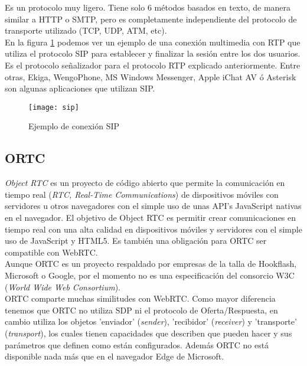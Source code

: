 Es un protocolo muy ligero. Tiene solo 6 métodos basados en texto, de manera similar a HTTP o SMTP, pero es completamente independiente del protocolo de transporte utilizado (TCP, UDP, ATM, etc). \\

En la figura \ref{fig:sip} podemos ver un ejemplo de una conexión multimedia con RTP que utiliza el protocolo SIP para establecer y finalizar la sesión entre los dos usuarios.\\

Es el protocolo señalizador para el protocolo RTP explicado anteriormente. Entre otras, Ekiga, WengoPhone, MS Windows Messenger, Apple iChat AV ó Asterisk son algunas aplicaciones que utilizan SIP.\\


\begin{figure}[h!]
\centering
\texttt{[image: sip]}
\caption{Ejemplo de conexión SIP}
\label{fig:sip}
\end{figure}



\subsection{ORTC}

\emph{Object RTC} es un proyecto de código abierto que permite la comunicación en tiempo real (\emph{RTC, Real-Time Communications}) de dispositivos móviles con servidores u otros navegadores con el simple uso de unas API's JavaScript nativas en el navegador. El objetivo de Object RTC es permitir crear comunicaciones en tiempo real con una alta calidad en dispositivos móviles y servidores con el simple uso de JavaScript y HTML5. Es también una obligación para ORTC ser compatible con WebRTC.\\

Aunque ORTC es un proyecto respaldado por empresas de la talla de Hookflash, Microsoft o Google, por el momento no es una especificación del consorcio W3C (\emph{World Wide Web Consortium}).\\

ORTC comparte muchas similitudes con WebRTC. Como mayor diferencia tenemos que ORTC no utiliza SDP ni el protocolo de Oferta/Respuesta, en cambio utiliza los objetos 'enviador' (\emph{sender}), 'recibidor' (\emph{receiver}) y 'transporte' (\emph{transport}), los cuales tienen capacidades que describen que pueden hacer y sus parámetros que definen como están configurados. Además ORTC no está disponible nada más que en el navegador Edge de Microsoft.\\


